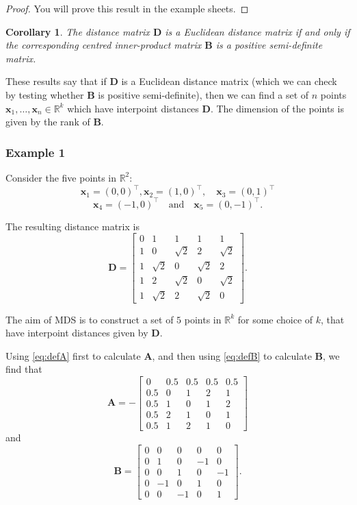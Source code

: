 \documentclass[
]{book}
\newtheorem{corollary}{Corollary}[chapter]
\theoremstyle{definition}
\theoremstyle{definition}
\theoremstyle{definition}
\theoremstyle{definition}
\theoremstyle{remark}
\begin{document}
\begin{proof}
You will prove this result in the example sheets.
\end{proof}

\begin{corollary}
\protect\hypertarget{cor:unnamed-chunk-4}{}\label{cor:unnamed-chunk-4}The distance matrix \(\mathbf D\) is a Euclidean distance matrix if and only if the corresponding centred inner-product matrix \(\mathbf B\) is a positive semi-definite matrix.
\end{corollary}

These results say that if \(\mathbf D\) is a Euclidean distance matrix (which we can check by testing whether \(\mathbf B\) is positive semi-definite), then we can find a set of \(n\) points \(\mathbf x_1, \ldots, \mathbf x_n\in \mathbb{R}^k\) which have interpoint distances \(\mathbf D\). The dimension of the points is given by the rank of \(\mathbf B\).

\subsubsection*{Example 1}\label{example-1}

Consider the five points in \(\mathbb{R}^2\):
\[
\mathbf x_1=(0,0)^\top,  \mathbf x_2 =(1,0)^\top, \quad \mathbf x_3 =(0,1)^\top
\]
\[
\mathbf x_4 =(-1,0)^\top \quad \text{and} \quad \mathbf x_5=(0,-1)^\top.
\]

The resulting distance matrix is
\[
\mathbf D=\left [ \begin{array}{ccccc}
0&1&1&1&1\\
1&0&\sqrt{2}&2&\sqrt{2}\\
1&\sqrt{2}&0&\sqrt{2}&2\\
1&2&\sqrt{2}&0&\sqrt{2}\\
1&\sqrt{2}&2&\sqrt{2}&0
\end{array} \right ].
\]

The aim of MDS is to construct a set of \(5\) points in \(\mathbb{R}^k\) for some choice of \(k\), that have interpoint distances given by \(\mathbf D\).

Using \eqref{eq:defA} first to calculate \(\mathbf A\), and then using \eqref{eq:defB} to calculate \(\mathbf B\), we find that
\[
\mathbf A=-\left [ \begin{array}{ccccc}
0&0.5&0.5&0.5&0.5\\
0.5&0&1&2&1\\
0.5&1&0&1&2\\
0.5&2&1&0&1\\
0.5&1&2&1&0
\end{array} \right ]
\]
and
\[
\mathbf B=\left [ \begin{array}{ccccc}
 0& 0&0&0&0\\
0&1&0&-1&0\\
0&0&1&0&-1\\
0&-1&0&1&0\\
0&0&-1&0&1
\end{array} \right ].
\]
\end{document}
